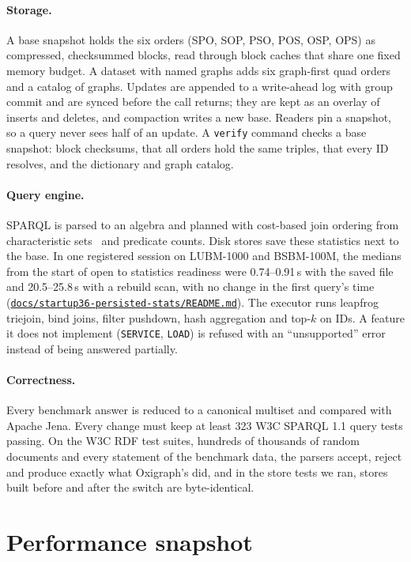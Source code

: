 \documentclass[sigconf,nonacm]{acmart}
\newcommand{\repo}[1]{\href{https://github.com/odysa/triplelight/blob/main/#1}{\nolinkurl{#1}}}
\begin{document}
\paragraph{Storage.} A base snapshot holds the six orders (SPO, SOP, PSO, POS, OSP, OPS) as compressed, checksummed
blocks, read through block caches that share one fixed memory budget. A dataset with named graphs adds six graph-first
quad orders and a catalog of graphs. Updates are appended to a write-ahead log with group commit and are synced
before the call returns; they are kept as an overlay of inserts and deletes, and compaction writes a new base.
Readers pin a snapshot, so a query never sees half of an update. A \texttt{verify} command checks a base snapshot: block checksums, that all orders hold the same triples, that every
ID resolves, and the dictionary and graph catalog.

\paragraph{Query engine.} SPARQL is parsed to an algebra and planned with cost-based join ordering from characteristic
sets~\cite{charsets} and predicate counts. Disk stores save these statistics next to the base. In one registered session on LUBM-1000 and BSBM-100M,
the medians from the start of open to statistics readiness were 0.74--0.91\,s with the saved file and
20.5--25.8\,s with a rebuild scan, with no change in the first query's time
(\repo{docs/startup36-persisted-stats/README.md}). The executor runs leapfrog triejoin, bind joins, filter
pushdown, hash aggregation and top-$k$ on IDs. A feature it does not implement (\texttt{SERVICE}, \texttt{LOAD})
is refused with an ``unsupported'' error instead of being answered partially.

\paragraph{Correctness.} Every benchmark answer is reduced to a canonical multiset and compared with Apache Jena.
Every change must keep at least 323 W3C SPARQL 1.1 query tests passing. On the W3C RDF test suites, hundreds of thousands of random documents and every statement of the benchmark data,
the parsers accept, reject and produce exactly what Oxigraph's did, and in the store tests we ran, stores built before
and after the switch are byte-identical.

\section{Performance snapshot}
\label{sec:perf}
\end{document}
